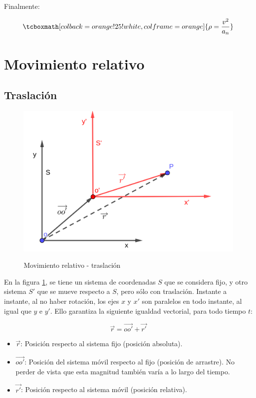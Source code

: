 \documentclass{article}
\begin{document}
Finalmente:

\begin{equation}
\tcboxmath[colback=orange!25!white,colframe=orange]{
\rho = \frac{v^2}{a_n}
}
\end{equation}

\section{Movimiento relativo}

\subsection{Traslación}

\begin{figure}[ht]
\centering
\caption{Movimiento relativo - traslación}
\includegraphics[scale=1.3]{../../common/img/62.01/theory/03-kinematics-rel-mov-tra.png}
\label{fig:relMovTra}
\end{figure}

En la figura \ref{fig:relMovTra}, se tiene un sistema de coordenadas $S$ que se considera fijo, y otro sistema $S'$ que se mueve respecto a $S$, pero sólo con traslación. Instante a instante, al no haber rotación, los ejes $x$ y $x'$ son paralelos en todo instante, al igual que $y$ e $y'$. Ello garantiza la siguiente igualdad vectorial, para todo tiempo $t$:

\begin{equation}
\overrightarrow{r} = \overrightarrow{oo'} + \overrightarrow{r'}
\end{equation}

\begin{itemize}
\item $\overrightarrow{r}$: Posición respecto al sistema fijo (posición absoluta).
\item $\overrightarrow{oo'}$: Posición del sistema móvil respecto al fijo (posición de arrastre). No perder de vista que esta magnitud también varía a lo largo del tiempo.
\item $\overrightarrow{r'}$: Posición respecto al sistema móvil (posición relativa).
\end{itemize}
\end{document}
